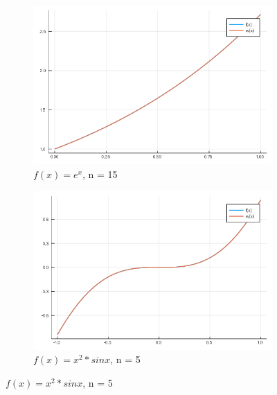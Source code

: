\documentclass{article}
\begin{document}
\begin{figure}[ht]
	\begin{subfigure}{.5\textwidth}
		\centering
		\includegraphics[width=.8\linewidth]{plots/5_3.png}  
		\caption*{$f(x) = e^x$, n = 15}
	\end{subfigure}
	\begin{subfigure}{.5\textwidth}
		\centering
		\includegraphics[width=.8\linewidth]{plots/5_4.png}  
		\caption*{$f(x) = x^2*sinx$, n = 5}
	\end{subfigure}
\end{figure}
\end{document}
